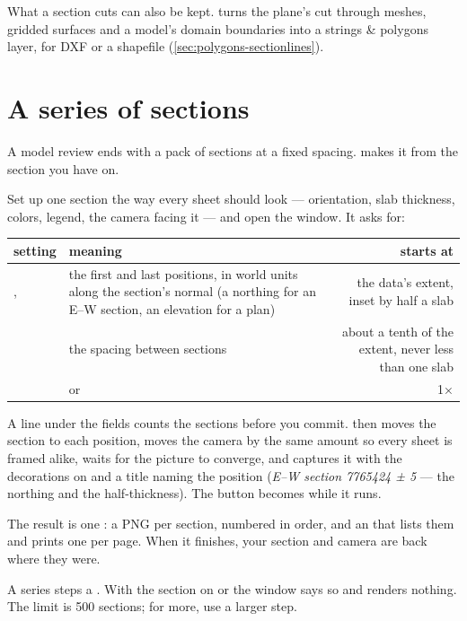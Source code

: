 What a section cuts can also be kept.  turns the plane's cut
through meshes, gridded surfaces and a model's domain boundaries into a strings \& polygons layer, for
DXF or a shapefile (\cref{sec:polygons-sectionlines}).

\section{A series of sections}\label{sec:sections-series}
A model review ends with a pack of sections at a fixed spacing.  makes it from the section you have on.

Set up one section the way every sheet should look — orientation, slab thickness, colors, legend, the camera facing it — and open the window. It asks for:

\begin{center}
\begin{tabularx}{\linewidth}{@{}lMD@{}}\toprule
setting & meaning & starts at \\ \midrule
{},  & the first and last positions, in world units along the section's normal (a northing for an E–W section, an elevation for a plan) & the data's extent, inset by half a slab \\
 & the spacing between sections & about a tenth of the extent, never less than one slab \\
 &  or  & 1× \\ \bottomrule
\end{tabularx}
\end{center}

A line under the fields counts the sections before you commit.  then moves the section to each position, moves the camera by the same amount so every sheet is framed alike, waits for the picture to converge, and captures it with the decorations on and a title naming the position (\emph{E–W section 7765424 ± 5} — the northing and the half-thickness). The button becomes  while it runs.

The result is one : a PNG per section, numbered in order, and an  that lists them and prints one per page. When it finishes, your section and camera are back where they were.

\begin{caution}
A series steps a . With the section on  or  the window says so and renders nothing. The limit is 500 sections; for more, use a larger step.
\end{caution}

